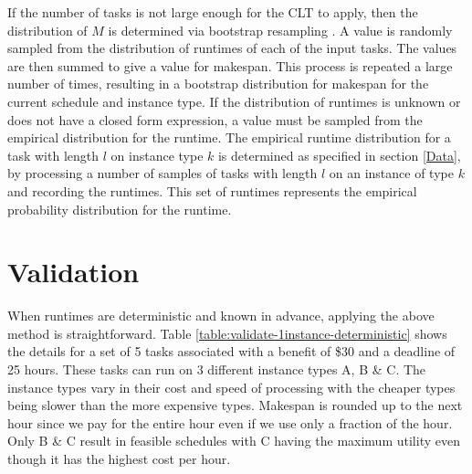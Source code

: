 \documentclass[12pt]{report}
\begin{document}
If the number of tasks is not large enough for the CLT to apply, then the distribution of $M$ is determined via bootstrap resampling \cite{Efron1993}.
A value is randomly sampled from the distribution of runtimes of each of the input tasks.
The values are then summed to give a value for makespan.
This process is repeated a large number of times, resulting in a bootstrap distribution for makespan for the current schedule and instance type.
If the distribution of runtimes is unknown or does not have a closed form expression, a value must be sampled from the empirical distribution for the runtime.
The empirical runtime distribution for a task with length $l$ on instance type $k$ is determined as specified in section \ref{Data}, by processing a number of samples of tasks with length $l$ on an instance of type $k$ and recording the runtimes.
This set of runtimes represents the empirical probability distribution for the runtime.

\section{Validation}

\label{validate:runtimes:deterministic}
When runtimes are deterministic and known in advance, applying the above method is straightforward. Table \ref{table:validate-1instance-deterministic} shows the details for a set of 5 tasks associated with a benefit of \$30 and a deadline of 25 hours. These tasks can run on 3 different instance types A, B \& C. The instance types vary in their cost and speed of processing with the cheaper types being slower than the more expensive types. Makespan is rounded up to the next hour since we pay for the entire hour even if we use only a fraction of the hour. Only B \& C result in feasible schedules with C having the maximum utility even though it has the highest cost per hour.
\end{document}
